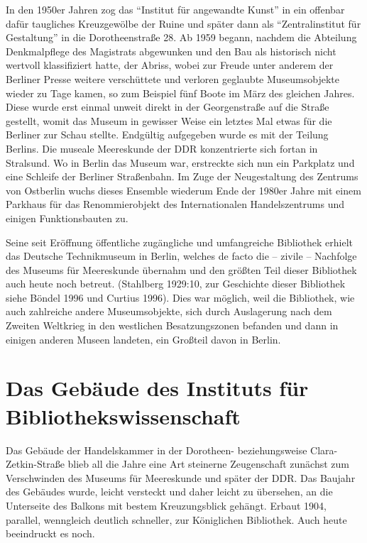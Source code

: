 \documentclass[a4paper,
fontsize=11pt,
oneside,
numbers=noperiodatend,
parskip=half-,
bibliography=totoc,
final
]{scrartcl}
\begin{document}
In den 1950er Jahren zog das \enquote{Institut für angewandte Kunst} in
ein offenbar dafür taugliches Kreuzgewölbe der Ruine und später dann als
\enquote{Zentralinstitut für Gestaltung} in die Dorotheenstraße 28. Ab
1959 begann, nachdem die Abteilung Denkmalpflege des Magistrats
abgewunken und den Bau als historisch nicht wertvoll klassifiziert
hatte, der Abriss, wobei zur Freude unter anderem der Berliner Presse
weitere verschüttete und verloren geglaubte Museumsobjekte wieder zu
Tage kamen, so zum Beispiel fünf Boote im März des gleichen Jahres.
Diese wurde erst einmal unweit direkt in der Georgenstraße auf die
Straße gestellt, womit das Museum in gewisser Weise ein letztes Mal
etwas für die Berliner zur Schau stellte. Endgültig aufgegeben wurde es
mit der Teilung Berlins. Die museale Meereskunde der DDR konzentrierte
sich fortan in Stralsund. Wo in Berlin das Museum war, erstreckte sich
nun ein Parkplatz und eine Schleife der Berliner Straßenbahn. Im Zuge
der Neugestaltung des Zentrums von Ostberlin wuchs dieses Ensemble
wiederum Ende der 1980er Jahre mit einem Parkhaus für das
Renommierobjekt des Internationalen Handelszentrums und einigen
Funktionsbauten zu.

Seine seit Eröffnung öffentliche zugängliche und umfangreiche Bibliothek
erhielt das Deutsche Technikmuseum in Berlin, welches de facto die --
zivile -- Nachfolge des Museums für Meereskunde übernahm und den größten
Teil dieser Bibliothek auch heute noch betreut. (Stahlberg 1929:10, zur
Geschichte dieser Bibliothek siehe Böndel 1996 und Curtius 1996). Dies
war möglich, weil die Bibliothek, wie auch zahlreiche andere
Museumsobjekte, sich durch Auslagerung nach dem Zweiten Weltkrieg in den
westlichen Besatzungszonen befanden und dann in einigen anderen Museen
landeten, ein Großteil davon in Berlin.

\hypertarget{das-gebuxe4ude-des-instituts-fuxfcr-bibliothekswissenschaft}{%
\section{Das Gebäude des Instituts für
Bibliothekswissenschaft}\label{das-gebuxe4ude-des-instituts-fuxfcr-bibliothekswissenschaft}}

Das Gebäude der Handelskammer in der Dorotheen- beziehungsweise
Clara-Zetkin-Straße blieb all die Jahre eine Art steinerne Zeugenschaft
zunächst zum Verschwinden des Museums für Meereskunde und später der
DDR. Das Baujahr des Gebäudes wurde, leicht versteckt und daher leicht
zu übersehen, an die Unterseite des Balkons mit bestem Kreuzungsblick
gehängt. Erbaut 1904, parallel, wenngleich deutlich schneller, zur
Königlichen Bibliothek. Auch heute beeindruckt es noch.
\end{document}
